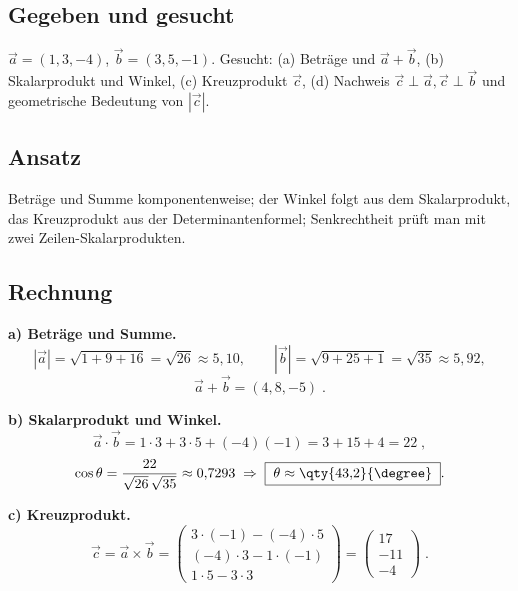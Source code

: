
\subsection*{Gegeben und gesucht}
$\vec a=(1,3,-4)$, $\vec b=(3,5,-1)$. Gesucht: (a) Beträge und $\vec a+\vec b$,
(b) Skalarprodukt und Winkel, (c) Kreuzprodukt $\vec c$, (d) Nachweis
$\vec c\perp\vec a,\vec c\perp\vec b$ und geometrische Bedeutung von $|\vec c|$.

\subsection*{Ansatz}
Beträge und Summe komponentenweise; der Winkel folgt aus dem
Skalarprodukt, das Kreuzprodukt aus der Determinantenformel;
Senkrechtheit prüft man mit zwei Zeilen-Skalarprodukten.

\subsection*{Rechnung}
\textbf{a) Beträge und Summe.}
\begin{equation}
  |\vec a|=\sqrt{1+9+16}=\sqrt{26}\approx5{,}10,\qquad
  |\vec b|=\sqrt{9+25+1}=\sqrt{35}\approx5{,}92,
\end{equation}
\begin{equation}
  \vec a+\vec b=(4,8,-5)\;.
\end{equation}

\textbf{b) Skalarprodukt und Winkel.}
\begin{equation}
  \vec a\cdot\vec b=1\cdot3+3\cdot5+(-4)(-1)=3+15+4=22\;,
\end{equation}
\begin{equation}
  \cos\theta=\frac{22}{\sqrt{26}\,\sqrt{35}}
  \approx0{,}7293
  \;\Rightarrow\;
  \boxed{\;\theta\approx\qty{43{,}2}{\degree}\;}.
\end{equation}

\textbf{c) Kreuzprodukt.}
\begin{equation}
  \vec c=\vec a\times\vec b
  =\begin{pmatrix}
      3\cdot(-1)-(-4)\cdot5\\ (-4)\cdot3-1\cdot(-1)\\ 1\cdot5-3\cdot3
   \end{pmatrix}
  =\begin{pmatrix}17\\ -11\\ -4\end{pmatrix}\;.
\end{equation}


